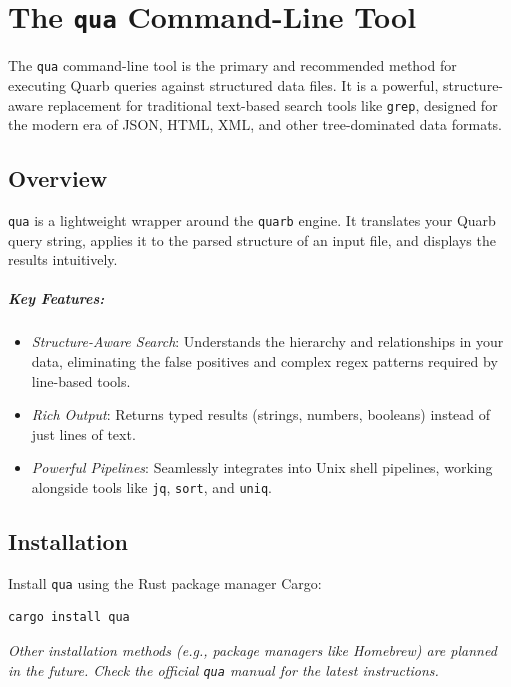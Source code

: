 
\chapter{The \texttt{qua} Command-Line Tool}

The \texttt{qua} command-line tool
	is the primary and recommended method for executing Quarb queries
	against structured data files.
It is a powerful, structure-aware replacement
	for traditional text-based search tools like \texttt{grep},
	designed for the modern era of JSON, HTML, XML, and other tree-dominated data formats.


\section{Overview}

\texttt{qua} is a lightweight wrapper around the \texttt{quarb} engine.
It translates your Quarb query string,
	applies it to the parsed structure of an input file,
	and displays the results intuitively.

\paragraph{Key Features:}
\begin{itemize}
	\item \emph{Structure-Aware Search}:
		Understands the hierarchy and relationships in your data,
			eliminating the false positives
			and complex regex patterns required by line-based tools.

	\item \emph{Rich Output}:
		Returns typed results
			(strings, numbers, booleans) instead of just lines of text.

	\item \emph{Powerful Pipelines}:
		Seamlessly integrates into Unix shell pipelines,
			working alongside tools like
			\texttt{jq}, \texttt{sort}, and \texttt{uniq}.
\end{itemize}

\section{Installation}

Install \texttt{qua} using the Rust package manager Cargo:
\begin{verbatim}
cargo install qua
\end{verbatim}
\emph{Other installation methods (e.g., package managers like Homebrew)
	are planned in the future.
	Check the official \texttt{qua} manual for the latest instructions.}

